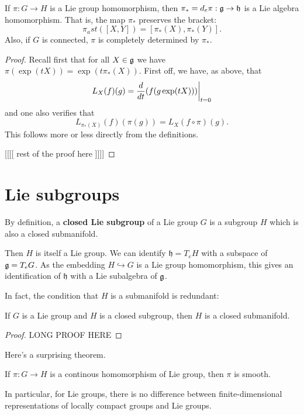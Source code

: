 \documentclass[11pt, english]{article}
\begin{document}
\begin{thm}
If $\pi:G \to H$ is a Lie group homomorphism, then $\pi_\ast= d_e \pi: \mathfrak g \to \mathfrak h$ is a Lie algebra homomorphism. That is, the map $\pi_\ast$ preserves the bracket:
$$
\pi_ast([X,Y]) = [\pi_\ast(X), \pi_\ast(Y)].
$$
Also, if $G$ is connected, $\pi$ is completely determined by $\pi_\ast$.
\end{thm}
\begin{proof}
Recall first that for all $X \in \mathfrak g$ we have $\pi(\exp(t X)) = \exp(t \pi_\ast (X))$. First off, we have, as above, that
$$
L_X(f)(g) = \restr{ \frac{d}{dt} (f(g \exp(tX)))}{t=0}
$$
and one also verifies that
$$
L_{\pi_\ast(X)} (f) (\pi(g)) = L_X(f \circ \pi)(g).
$$
This follows more or less directly from the definitions. 

[[[[ rest of the proof here ]]]]
\end{proof}



\newpage
\section{Lie subgroups}

By definition, a \textbf{closed Lie subgroup} of a Lie group $G$ is a subgroup $H$ which is also a closed submanifold. 

Then $H$ is itself a Lie group. We can identify $\mathfrak h = T_e H$ with a subspace of $\mathfrak g = T_eG$. As the embedding $H \hookrightarrow G$ is a Lie group homomorphism, this gives an identification of $\mathfrak h$ with a Lie subalgebra of $\mathfrak g$. 

In fact, the condition that $H$ is a submanifold is redundant:

\begin{thm}
If $G$ is a Lie group and $H$ is a closed subgroup, then $H$ is a closed submanifold.
\end{thm}
\begin{proof}
LONG PROOF HERE
\end{proof}

Here's a surprising theorem.

\begin{thm}
If $\pi:G \to H$ is a continous homomorphism of Lie group, then $\pi$ is smooth.
\end{thm}

In particular, for Lie groups, there is no difference between finite-dimensional representations of locally compact groups and Lie groups. 
\end{document}
